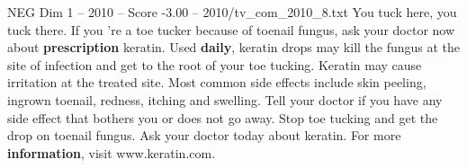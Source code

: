 \begin{textsample}{NEG Dim 1 – 2010 – Score -3.00 – 2010/tv\_com\_2010\_8.txt}  \label{ex:f1_neg_031}
You tuck here, you tuck there.
If you 're a toe tucker because of toenail fungus, ask your doctor now about \textbf{prescription} keratin.
Used \textbf{daily}, keratin drops may kill the fungus at the site of infection and get to the root of your toe tucking.
Keratin may cause irritation at the treated site.
Most common side effects include skin peeling, ingrown toenail, redness, itching and swelling.
Tell your doctor if you have any side effect that bothers you or does not go away.
Stop toe tucking and get the drop on toenail fungus.
Ask your doctor today about keratin.
For more \textbf{information}, visit www.keratin.com.

\end{textsample}

